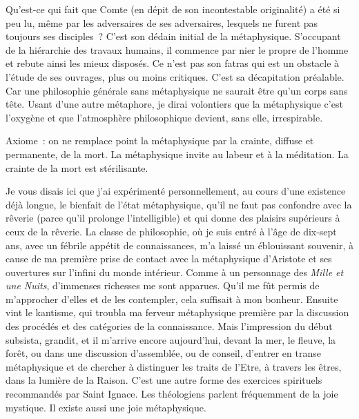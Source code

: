 \documentclass[french,twoside]{book} %
\begin{document}
Qu’est-ce qui fait que Comte (en dépit de son incontestable originalité) a été si peu lu, même par les adversaires de ses adversaires, lesquels ne furent pas toujours ses disciples ? C’est son dédain initial de la métaphysique. S’occupant de la hiérarchie des travaux humains, il commence par nier le propre de l’homme et rebute ainsi les mieux disposés. Ce n’est pas son fatras qui est un obstacle à l’étude de ses ouvrages, plus ou moins critiques. C’est sa décapitation préalable. Car une philosophie générale sans métaphysique ne saurait être qu’un corps sans tête. Usant d’une autre métaphore, je dirai volontiers que la métaphysique c’est l’oxygène et que l’atmosphère philosophique devient, sans elle, irrespirable.\par
Axiome : on ne remplace point la métaphysique par la crainte, diffuse et permanente, de la mort. La métaphysique invite au labeur et à la méditation. La crainte de la mort est stérilisante.\par
Je vous disais ici que j’ai expérimenté personnellement, au cours d’une existence déjà longue, le bienfait de l’état métaphysique, qu’il ne faut pas confondre avec la rêverie (parce qu’il prolonge l’intelligible) et qui donne des plaisirs supérieurs à ceux de la rêverie. La classe de philosophie, où je suis entré à l’âge de dix-sept ans, avec un fébrile appétit de connaissances, m’a laissé un éblouissant souvenir, à cause de ma première prise de contact avec la métaphysique d’Aristote et ses ouvertures sur l’infini du monde intérieur. Comme à un personnage des {\itshape Mille et une Nuits}, d’immenses richesses me sont apparues. Qu’il me fût permis de m’approcher d’elles et de les contempler, cela suffisait à mon bonheur. Ensuite vint le kantisme, qui troubla ma ferveur métaphysique première par la discussion des procédés et des catégories de la connaissance. Mais l’impression du début subsista, grandit, et il m’arrive encore aujourd’hui, devant la mer, le fleuve, la forêt, ou dans une discussion d’assemblée, ou de conseil, d’entrer en transe métaphysique et de chercher à distinguer les traits de l’Etre, à travers les êtres, dans la lumière de la Raison. C’est une autre forme des exercices spirituels recommandés par Saint Ignace. Les théologiens parlent fréquemment de la joie mystique. Il existe aussi une joie métaphysique.\par
\end{document}
